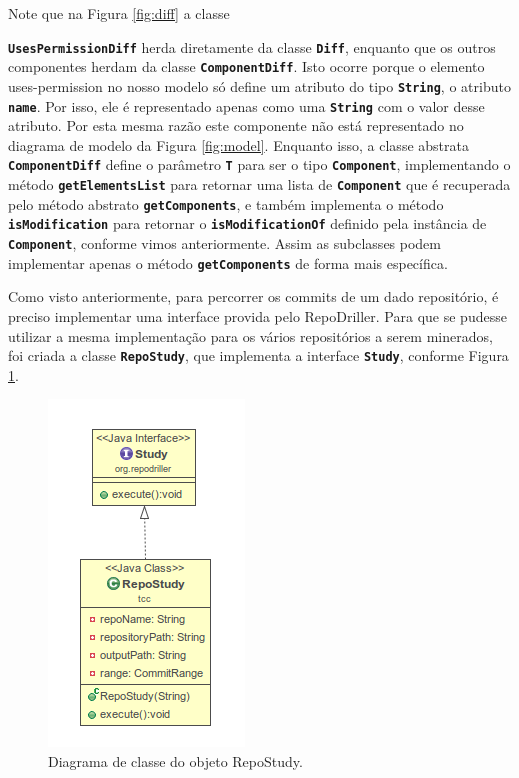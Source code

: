\documentclass[a4paper,12pt]{article}
\begin{document}
Note que na Figura \ref{fig:diff} a classe {\small\texttt{\textbf{UsesPermissionDiff}} herda diretamente da classe {\small\texttt{\textbf{Diff}}}, enquanto que os outros componentes herdam da classe {\small\texttt{\textbf{ComponentDiff}}}. Isto ocorre porque o elemento uses-permission no nosso modelo só define um atributo do tipo {\small\texttt{\textbf{String}}}, o atributo {\small\texttt{\textbf{name}}}. Por isso, ele é representado apenas como uma {\small\texttt{\textbf{String}}} com o valor desse atributo. Por esta mesma razão este componente não está representado no diagrama de modelo da Figura \ref{fig:model}. Enquanto isso, a classe abstrata {\small\texttt{\textbf{ComponentDiff}}} define o parâmetro {\small\texttt{\textbf{T}}} para ser o tipo {\small\texttt{\textbf{Component}}}, implementando o método {\small\texttt{\textbf{getElementsList}}} para retornar uma lista de {\small\texttt{\textbf{Component}}} que é recuperada pelo método abstrato {\small\texttt{\textbf{getComponents}}}, e também implementa o método {\small\texttt{\textbf{isModification}}} para retornar o {\small\texttt{\textbf{isModificationOf}}}  definido pela instância de {\small\texttt{\textbf{Component}}}, conforme vimos anteriormente. Assim as subclasses podem implementar apenas o método {\small\texttt{\textbf{getComponents}}} de forma mais específica.

Como visto anteriormente, para percorrer os commits de um dado repositório, é preciso implementar uma interface provida pelo RepoDriller. Para que se pudesse utilizar a mesma implementação para os vários repositórios a serem minerados, foi criada a classe {\small\texttt{\textbf{RepoStudy}}}, que implementa a interface {\small\texttt{\textbf{Study}}}, conforme Figura \ref{fig:study}.

\begin{figure}[h]
\centering
\includegraphics[width=0.3\linewidth, height=0.45\linewidth]{imgs/study.png}
\caption{Diagrama de classe do objeto RepoStudy.}
\label{fig:study}
\end{figure}

}
\end{document}
